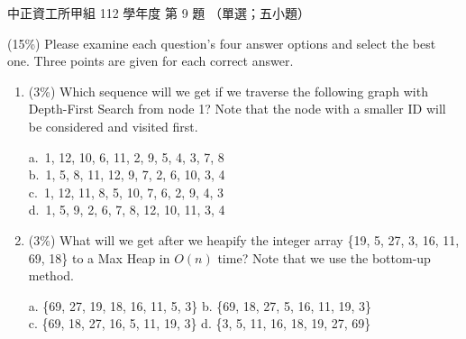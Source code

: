 \begin{pastexam}[label={px:ccu-112-swa-02}]{中正資工所甲組 112 學年度 第 9 題}
（單選；五小題）

(15\%) Please examine each question's four answer options and select the best one. Three points are
given for each correct answer.
\begin{enumerate}[label=(\arabic*),itemsep=4pt,topsep=2pt]
\item (3\%) Which sequence will we get if we traverse the following graph with Depth-First Search from node 1? Note that the node with a smaller ID will be considered and visited first.
\begin{center}
\end{center}
a.~1, 12, 10, 6, 11, 2, 9, 5, 4, 3, 7, 8\\
b.~1, 5, 8, 11, 12, 9, 7, 2, 6, 10, 3, 4\\
c.~1, 12, 11, 8, 5, 10, 7, 6, 2, 9, 4, 3\\
d.~1, 5, 9, 2, 6, 7, 8, 12, 10, 11, 3, 4

\item (3\%) What will we get after we heapify the integer array \{19, 5, 27, 3, 16, 11, 69, 18\} to a Max Heap in $O(n)$ time? Note that we use the bottom-up method.

a. \{69, 27, 19, 18, 16, 11, 5, 3\} \qquad b. \{69, 18, 27, 5, 16, 11, 19, 3\}\\
c. \{69, 18, 27, 16, 5, 11, 19, 3\} \qquad d. \{3, 5, 11, 16, 18, 19, 27, 69\}


\end{enumerate}
\end{pastexam}
